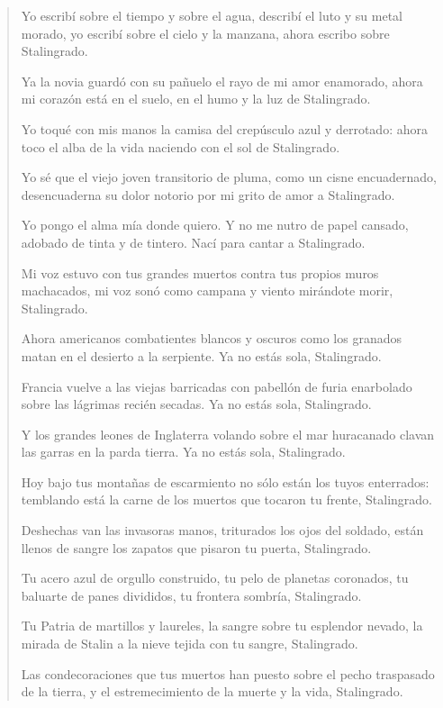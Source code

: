 \documentclass[12pt]{article}
\begin{document}
\clearpage
{}
\begin{verse}
Yo escribí sobre el tiempo y sobre el agua,  
describí el luto y su metal morado,  
yo escribí sobre el cielo y la manzana,  
	ahora escribo sobre Stalingrado.  
	
Ya la novia guardó con su pañuelo  
el rayo de mi amor enamorado,  
ahora mi corazón está en el suelo,  
	en el humo y la luz de Stalingrado.  
	
Yo toqué con mis manos la camisa  
del crepúsculo azul y derrotado:  
ahora toco el alba de la vida  
	naciendo con el sol de Stalingrado.  
	
Yo sé que el viejo joven transitorio  
de pluma, como un cisne encuadernado,  
desencuaderna su dolor notorio  
	por mi grito de amor a Stalingrado.  
	
Yo pongo el alma mía donde quiero.  
Y no me nutro de papel cansado,  
adobado de tinta y de tintero.  
	Nací para cantar a Stalingrado.  
	
Mi voz estuvo con tus grandes muertos  
contra tus propios muros machacados,  
mi voz sonó como campana y viento  
	mirándote morir, Stalingrado.  
	
Ahora americanos combatientes  
blancos y oscuros como los granados  
matan en el desierto a la serpiente.  
	Ya no estás sola, Stalingrado.  
	
Francia vuelve a las viejas barricadas  
con pabellón de furia enarbolado  
sobre las lágrimas recién secadas.  
	Ya no estás sola, Stalingrado.  
	
Y los grandes leones de Inglaterra  
volando sobre el mar huracanado  
clavan las garras en la parda tierra.  
	Ya no estás sola, Stalingrado.  
	
Hoy bajo tus montañas de escarmiento  
no sólo están los tuyos enterrados:  
temblando está la carne de los muertos  
	que tocaron tu frente, Stalingrado.  
	
Deshechas van las invasoras manos,  
triturados los ojos del soldado,  
están llenos de sangre los zapatos  
	que pisaron tu puerta, Stalingrado.  
	
Tu acero azul de orgullo construido,  
tu pelo de planetas coronados,  
tu baluarte de panes divididos,  
	tu frontera sombría, Stalingrado.  
	
Tu Patria de martillos y laureles,  
la sangre sobre tu esplendor nevado,  
la mirada de Stalin a la nieve  
	tejida con tu sangre, Stalingrado.  
	
Las condecoraciones que tus muertos  
han puesto sobre el pecho traspasado  
de la tierra, y el estremecimiento  
	de la muerte y la vida, Stalingrado.  
	

\end{verse}
\end{document}
